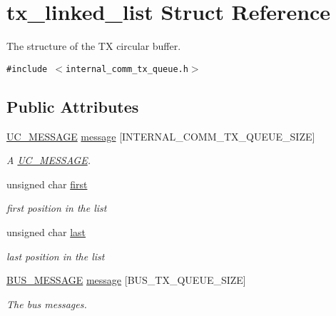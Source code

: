\hypertarget{structtx__linked__list}{
\section{tx\_\-linked\_\-list Struct Reference}
\label{structtx__linked__list}
}
The structure of the TX circular buffer.  


{\tt \#include $<$internal\_\-comm\_\-tx\_\-queue.h$>$}

\subsection*{Public Attributes}
\begin{CompactItemize}
\item 
\hypertarget{structtx__linked__list_91fe1c1fbc5f7c41c2e772fd5e954359}{
\hyperlink{structUC__MESSAGE}{UC\_\-MESSAGE} \hyperlink{structtx__linked__list_91fe1c1fbc5f7c41c2e772fd5e954359}{message} \mbox{[}INTERNAL\_\-COMM\_\-TX\_\-QUEUE\_\-SIZE\mbox{]}}
\label{structtx__linked__list_91fe1c1fbc5f7c41c2e772fd5e954359}

\begin{CompactList}\small\item\em A \hyperlink{structUC__MESSAGE}{UC\_\-MESSAGE}. \item\end{CompactList}\item 
unsigned char \hyperlink{structtx__linked__list_953e1b569a24b8d898896ef81b47499d}{first}
\begin{CompactList}\small\item\em first position in the list \item\end{CompactList}\item 
unsigned char \hyperlink{structtx__linked__list_7d2794d33345fb0d994a0a2556d72b73}{last}
\begin{CompactList}\small\item\em last position in the list \item\end{CompactList}\item 
\hypertarget{structtx__linked__list_e0d439f6aa38b19f116433fa9c1aab56}{
\hyperlink{structBUS__MESSAGE}{BUS\_\-MESSAGE} \hyperlink{structtx__linked__list_e0d439f6aa38b19f116433fa9c1aab56}{message} \mbox{[}BUS\_\-TX\_\-QUEUE\_\-SIZE\mbox{]}}
\label{structtx__linked__list_e0d439f6aa38b19f116433fa9c1aab56}

\begin{CompactList}\small\item\em The bus messages. \item\end{CompactList}\end{CompactItemize}


